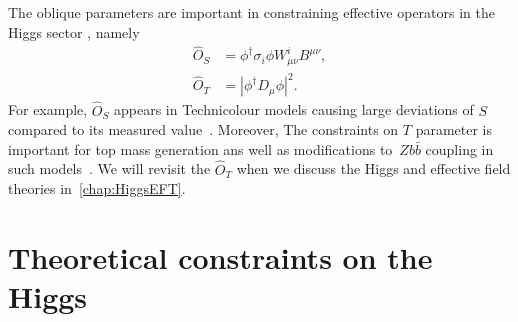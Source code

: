 The oblique parameters are important in constraining effective operators in the Higgs sector , namely
 \begin{align}
 \hat{O}_S &= \phi^\dagger \sigma_i \phi W^i_{\mu \nu} B^{\mu \nu}, \nonumber \\
\hat{O}_T &= |\phi^\dagger D_\mu \phi|^2.
\end{align}
For example, $\hat{O}_S$ appears in Technicolour models causing large deviations of $S$ compared to its measured value~\cite{GOLDEN19913,HOLDOM199088,ALTARELLI19923,PhysRevLett.65.964}. Moreover, The constraints on $T$ parameter is important for top mass generation ans well as modifications to~$Z  b \bar{b}$ coupling in such models~\cite{PhysRevLett.69.575,Simmons:1995df}. We will revisit the $\hat{O}_T$ when we discuss the Higgs and effective field theories in~\autoref{chap:HiggsEFT}.
\section{Theoretical constraints on the Higgs \label{sec:theoreticalconst}}
